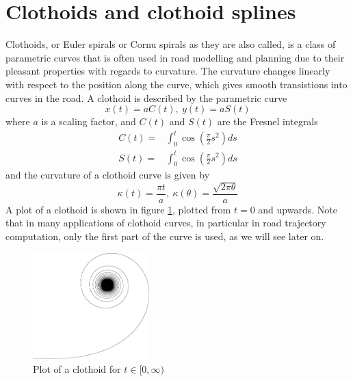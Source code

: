 \section{Clothoids and clothoid splines}
\label{sec:back_clothoid}
Clothoids, or Euler spirals or Cornu spirals as they are also called, is a class of parametric curves that is often used in road modelling and planning due to their pleasant properties with regards to curvature. The curvature changes linearly with respect to the position along the curve, which gives smooth transistions into curves in the road. A clothoid is described by the parametric curve
\begin{equation}
x(t) = aC(t),\  y(t) = aS(t) 
\label{eq:clothoid}
\end{equation}
where $a$ is a scaling factor, and $C(t)$ and $S(t)$ are the Fresnel integrals
\begin{align}
C(t) =& \int_0^t \cos\left(\frac{\pi}{2}s^2\right) ds \label{eq:fresnel_c}\\
S(t) =& \int_0^t \cos\left(\frac{\pi}{2}s^2\right) ds \label{eq:fresnel_s}
\end{align}
and the curvature of a clothoid curve is given by 
\begin{equation}
\kappa(t) = \frac{\pi t}{a},\ \kappa(\theta) = \frac{\sqrt{2\pi\theta}}{a}
\label{eq:clothoid_curvature}
\end{equation}
A plot of a clothoid is shown in figure \ref{fig:back_clothoid}, plotted from $t=0$ and upwards. Note that in many applications of clothoid curves, in particular in road trajectory computation, only the first part of the curve is used, as we will see later on.

\begin{figure}[ht]
\centering
\includegraphics[width=0.4\textwidth]{figure/cornu}
\caption{Plot of a clothoid for $t\in [0,\infty)$}
\label{fig:back_clothoid}
\end{figure}


